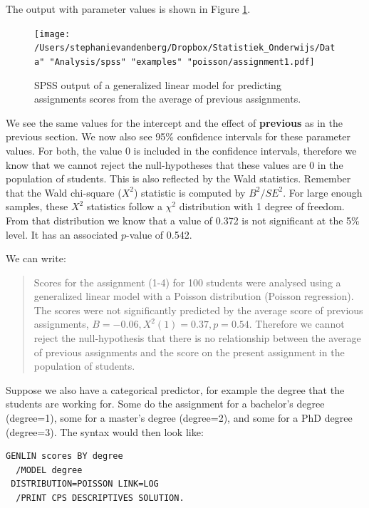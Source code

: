 \documentclass[]{book}\usepackage[]{graphicx}\usepackage[]{color}
\begin{document}
The output with parameter values is shown in Figure \ref{fig:assignment1}.


\begin{figure}[h]
    \begin{center}
       \texttt{[image: /Users/stephanievandenberg/Dropbox/Statistiek\_Onderwijs/Data" "Analysis/spss" "examples" "poisson/assignment1.pdf]}
    \end{center}
     \caption{SPSS output of a generalized linear model for predicting assignments scores from the average of previous assignments.}
    \label{fig:assignment1}
\end{figure}


We see the same values for the intercept and the effect of \textbf{previous} as in the previous section. We now also see 95\% confidence intervals for these parameter values. For both, the value 0 is included in the confidence intervals, therefore we know that we cannot reject the null-hypotheses that these values are 0 in the population of students. This is also reflected by the Wald statistics. Remember that the Wald chi-square ($X^2$) statistic is computed by $B^2/SE^2$. For large enough samples, these $X^2$ statistics follow a $\chi^2$ distribution with 1 degree of freedom. From that distribution we know that a value of 0.372 is not significant at the 5\% level. It has an associated $p$-value of 0.542.

We can write:

\begin{quotation}
Scores for the assignment (1-4) for 100 students were analysed using a generalized linear model with a Poisson distribution (Poisson regression). The scores were not significantly predicted by the average score of previous assignments, $B=-0.06, X^2(1)=0.37, p=0.54$. Therefore we cannot reject the null-hypothesis that there is no relationship between the average of previous assignments and the score on the present assignment in the population of students.
\end{quotation}



Suppose we also have a categorical predictor, for example the degree that the students are working for. Some do the assignment for a bachelor's degree (degree=1), some for a master's degree (degree=2), and some for a PhD degree (degree=3). The syntax would then look like:


\begin{verbatim}
GENLIN scores BY degree
  /MODEL degree
 DISTRIBUTION=POISSON LINK=LOG
  /PRINT CPS DESCRIPTIVES SOLUTION.
\end{verbatim}
\end{document}
